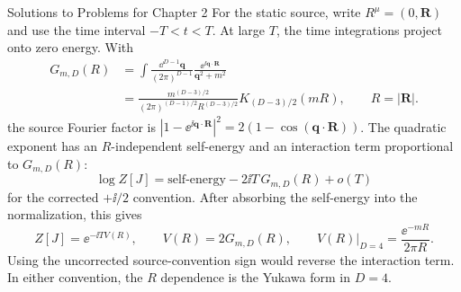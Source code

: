 \begin{bankssolutions}{Solutions to Problems for Chapter 2}
For the static source, write $R^{\mu}=(0,\mathbf R)$ and use the time interval $-T<t<T$. At large $T$, the time integrations project onto zero energy. With
\[
\begin{aligned}
  G_{m,D}(R)&=\int\frac{\dd^{D-1}\mathbf q}{(2\pi)^{D-1}}
  \frac{\ee^{\ii\mathbf q\mathbin{\cdot}\mathbf R}}{\mathbf q^{2}+m^{2}}\\
  &=\frac{m^{(D-3)/2}}{(2\pi)^{(D-1)/2}R^{(D-3)/2}}
  K_{(D-3)/2}(mR),
  \qquad R=|\mathbf R|.
\end{aligned}
\]
the source Fourier factor is $|1-\ee^{\ii\mathbf q\mathbin{\cdot}\mathbf R}|^{2}=2(1-\cos(\mathbf q\mathbin{\cdot}\mathbf R))$. The quadratic exponent has an $R$-independent self-energy and an interaction term proportional to $G_{m,D}(R)$:
\[
  \log Z[J]=\text{self-energy}-2\ii T\,G_{m,D}(R)+o(T)
\]
for the corrected $+\ii/2$ convention. After absorbing the self-energy into the normalization, this gives
\[
  Z[J]=\ee^{-\ii T V(R)},
  \qquad
  V(R)=2G_{m,D}(R),
  \qquad V(R)\big|_{D=4}=\frac{\ee^{-mR}}{2\pi R}.
\]
Using the uncorrected source-convention sign would reverse the interaction term. In either convention, the $R$ dependence is the Yukawa form in $D=4$.

\end{bankssolutions}
